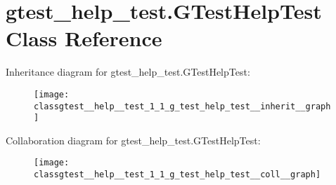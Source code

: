 \hypertarget{classgtest__help__test_1_1_g_test_help_test}{}\section{gtest\+\_\+help\+\_\+test.\+G\+Test\+Help\+Test Class Reference}
\label{classgtest__help__test_1_1_g_test_help_test}


Inheritance diagram for gtest\+\_\+help\+\_\+test.\+G\+Test\+Help\+Test\+:
\nopagebreak
\begin{figure}[H]
\begin{center}
\leavevmode
\texttt{[image: classgtest\_\_help\_\_test\_1\_1\_g\_test\_help\_test\_\_inherit\_\_graph]}
\end{center}
\end{figure}


Collaboration diagram for gtest\+\_\+help\+\_\+test.\+G\+Test\+Help\+Test\+:
\nopagebreak
\begin{figure}[H]
\begin{center}
\leavevmode
\texttt{[image: classgtest\_\_help\_\_test\_1\_1\_g\_test\_help\_test\_\_coll\_\_graph]}
\end{center}
\end{figure}
